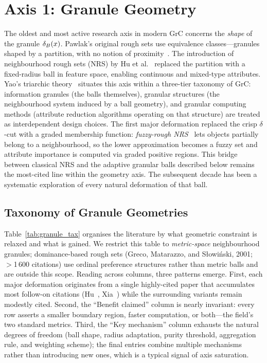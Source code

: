 \section{Axis 1: Granule Geometry}
\label{sec:geometry}

The oldest and most active research axis in modern GrC concerns the
\emph{shape} of the granule $\delta_{B}(x)$.  Pawlak's original rough sets use
equivalence classes---granules shaped by a partition, with no notion of
proximity~\cite{Pawlak1982}.  The introduction of neighbourhood rough sets
(NRS) by Hu et al.~\cite{Hu2008NRS} replaced the partition with a fixed-radius
ball in feature space, enabling continuous and mixed-type attributes.
Yao's triarchic theory~\cite{Yao2016triarchic} situates this axis within a
three-tier taxonomy of GrC: information granules (the balls themselves),
granular structures (the neighbourhood system induced by a ball geometry),
and granular computing methods (attribute reduction algorithms operating on that
structure) are treated as interdependent design choices.
The first major deformation replaced the crisp $\delta$-cut with a graded
membership function: \emph{fuzzy-rough NRS}~\cite{JensenShen2007TFS,Cornelis2010IS}
lets objects partially belong to a neighbourhood, so the lower approximation
becomes a fuzzy set and attribute importance is computed via graded positive
regions.  This bridge between classical NRS and the adaptive granular balls
described below remains the most-cited line within the geometry axis.
The subsequent decade has been a systematic exploration of every natural
deformation of that ball.

\subsection{Taxonomy of Granule Geometries}
\label{sec:geo_taxonomy}

Table~\ref{tab:granule_tax} organises the literature by what geometric
constraint is relaxed and what is gained.  We restrict this table to
\emph{metric-space} neighbourhood granules; dominance-based rough sets
(Greco, Matarazzo, and S\l{}owi\'nski, 2001; $>$1\,600 citations) use
ordinal preference structures rather than metric balls and are outside
this scope.  Reading across columns,
three patterns emerge.  First, each major deformation originates from a
single highly-cited paper that accumulates most follow-on citations
(Hu~\cite{Hu2008NRS}, Xia~\cite{Xia2020GBNRS}) while the surrounding
variants remain modestly cited.  Second, the ``Benefit claimed'' column
is nearly invariant: every row asserts a smaller boundary region,
faster computation, or both---the field's two standard metrics.  Third,
the ``Key mechanism'' column exhausts the natural degrees of freedom
(ball shape, radius adaptation, purity threshold, aggregation rule, and
weighting scheme); the final entries combine multiple mechanisms rather
than introducing new ones, which is a typical signal of axis saturation.

